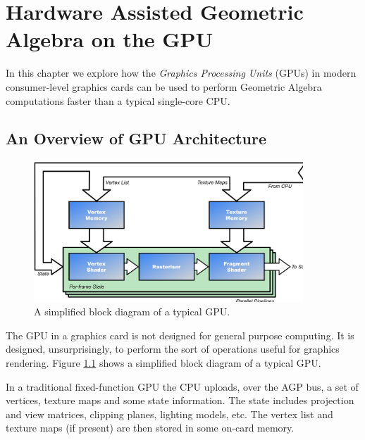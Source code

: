 \begin{savequote}
\end{savequote}

\chapter{Hardware Assisted Geometric Algebra on the GPU}
\label{chap:gpu}

In this chapter we explore how the \emph{Graphics Processing
Units} (GPUs) in modern consumer-level graphics cards can be
used to perform Geometric Algebra computations faster than a 
typical single-core CPU.

\section{An Overview of GPU Architecture}

\begin{figure}
\centering
\includegraphics[width=0.9\textwidth]{gpu_architecture}
\caption{\label{fig:gpu_architecture}%
  A simplified block diagram of a typical GPU.}
\end{figure}

The GPU in a graphics card is not designed for general purpose 
computing. It is designed, unsurprisingly, to perform the
sort of operations useful for graphics rendering. Figure
\ref{fig:gpu_architecture} shows a simplified block diagram of
a typical GPU.

In a traditional fixed-function GPU the CPU uploads, over the AGP
bus, a set of vertices, texture maps and some state information. The
state includes projection and view matrices, clipping planes, 
lighting models, etc. The vertex list and texture maps (if present) 
are then stored in some on-card memory.

